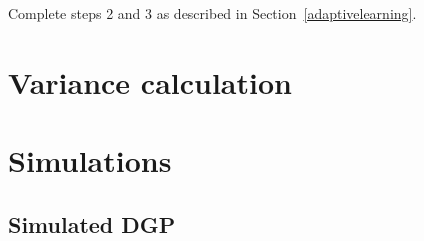 \documentclass[letterpaper, 12pt, parskip=full,DIV=10]{scrartcl}
\begin{document}
\begin{enumerate}
\end{enumerate}

Complete steps 2 and 3 as described in Section~\ref{adaptivelearning}. 


\section{Variance calculation}\label{appendix:variance}



\section{Simulations}
\subsection{Simulated DGP}\label{appendix:dgp}
\end{document}
